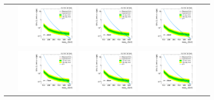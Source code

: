 \begin{figure}[!h]
  \centering 
  \begin{tabular}{c}
    \includegraphics[width=0.29\textwidth]{figures/analysis/Interpretation/ExclusionLimits/LimitPlot_ctau40cm.pdf} 
    \includegraphics[width=0.29\textwidth]{figures/analysis/Interpretation/ExclusionLimits/LimitPlot_ctau50cm.pdf} 
    \includegraphics[width=0.29\textwidth]{figures/analysis/Interpretation/ExclusionLimits/LimitPlot_ctau60cm.pdf} \\
    \includegraphics[width=0.29\textwidth]{figures/analysis/Interpretation/ExclusionLimits/LimitPlot_ctau70cm.pdf} 
    \includegraphics[width=0.29\textwidth]{figures/analysis/Interpretation/ExclusionLimits/LimitPlot_ctau80cm.pdf} 
    \includegraphics[width=0.29\textwidth]{figures/analysis/Interpretation/ExclusionLimits/LimitPlot_ctau90cm.pdf} \\

\end{tabular}
\end{figure}
